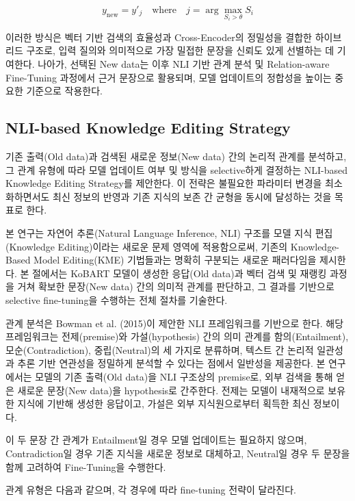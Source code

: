 \documentclass[a4paper,fleqn]{cas-sc}
\begin{document}
\begin{equation}
    y_{\text{new}} = y'_{j} \quad \text{where} \quad j = \arg\max_{S_i > \theta} S_i
\end{equation}

이러한 방식은 벡터 기반 검색의 효율성과 Cross-Encoder의 정밀성을 결합한 하이브리드 구조로, 입력 질의와 의미적으로 가장 밀접한 문장을 신뢰도 있게 선별하는 데 기여한다. 나아가, 선택된 New data는 이후 NLI 기반 관계 분석 및 Relation-aware Fine-Tuning 과정에서 근거 문장으로 활용되며, 모델 업데이트의 정합성을 높이는 중요한 기준으로 작용한다.


\subsection{NLI-based Knowledge Editing Strategy}

기존 출력(Old data)과 검색된 새로운 정보(New data) 간의 논리적 관계를 분석하고, 그 관계 유형에 따라 모델 업데이트 여부 및 방식을 selective하게 결정하는 NLI-based Knowledge Editing Strategy를 제안한다. 이 전략은 불필요한 파라미터 변경을 최소화하면서도 최신 정보의 반영과 기존 지식의 보존 간 균형을 동시에 달성하는 것을 목표로 한다. 

본 연구는 자연어 추론(Natural Language Inference, NLI) 구조를 모델 지식 편집(Knowledge Editing)이라는 새로운 문제 영역에 적용함으로써, 기존의 Knowledge-Based Model Editing(KME) 기법들과는 명확히 구분되는 새로운 패러다임을 제시한다. 본 절에서는 KoBART 모델이 생성한 응답(Old data)과 벡터 검색 및 재랭킹 과정을 거쳐 확보한 문장(New data) 간의 의미적 관계를 판단하고, 그 결과를 기반으로 selective fine-tuning을 수행하는 전체 절차를 기술한다.

관계 분석은 Bowman et al. (2015)이 제안한 NLI 프레임워크를 기반으로 한다. 해당 프레임워크는 전제(premise)와 가설(hypothesis) 간의 의미 관계를 함의(Entailment), 모순(Contradiction), 중립(Neutral)의 세 가지로 분류하며, 텍스트 간 논리적 일관성과 추론 기반 연관성을 정밀하게 분석할 수 있다는 점에서 일반성을 제공한다. 본 연구에서는 모델의 기존 출력(Old data)을 NLI 구조상의 premise로, 외부 검색을 통해 얻은 새로운 문장(New data)을 hypothesis로 간주한다. 전제는 모델이 내재적으로 보유한 지식에 기반해 생성한 응답이고, 가설은 외부 지식원으로부터 획득한 최신 정보이다.

이 두 문장 간 관계가 Entailment일 경우 모델 업데이트는 필요하지 않으며, Contradiction일 경우 기존 지식을 새로운 정보로 대체하고, Neutral일 경우 두 문장을 함께 고려하여 Fine-Tuning을 수행한다.

관계 유형은 다음과 같으며, 각 경우에 따라 fine-tuning 전략이 달라진다.
\end{document}
